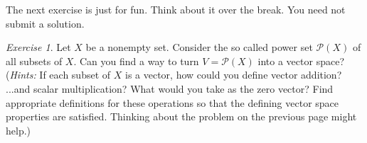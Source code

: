 \documentclass[fleqn,11pt]{paper}
\theoremstyle{remark}
\newtheorem*{exercise}{Exercise}
\newtheorem*{solution}{{\bf Solution}}
\newcommand{\<}{\ensuremath{\langle}}
\renewcommand{\>}{\ensuremath{\rangle}}
\begin{document}

\newpage

\noindent The next exercise is just for fun.  Think about it over the break. You need not submit a solution.
\begin{exercise}
  Let $X$ be a nonempty set.  Consider the so called power set $\mathscr{P}(X)$
  of all subsets of $X$. 
  Can you find a way to turn $V = \mathscr{P}(X)$ into a vector space?
  ({\it Hints:} If each subset of $X$ is a vector,
  how could you define vector addition? ...and scalar multiplication?
  What would you take as the zero vector? Find appropriate definitions for
  these operations so that the defining vector space properties are
  satisfied. Thinking about the problem on the previous page might help.)
\end{exercise}



\end{document}
